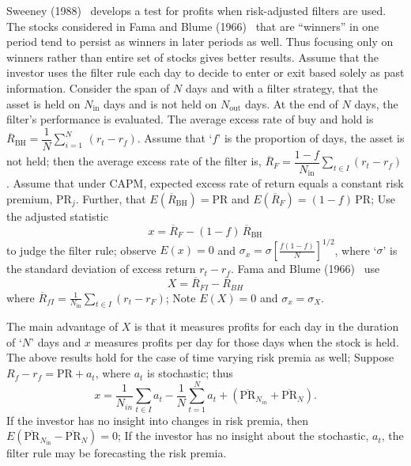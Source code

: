 Sweeney (1988)~\cite{sweet} develops a test for profits when risk-adjusted filters are used. The stocks considered in Fama and Blume (1966)~\cite{famablume} that are ``winners'' in one period tend to persist as winners in later periods as well. Thus focusing only on winners rather than entire set of stocks gives better results. Assume that the investor uses the filter rule each day to decide to enter or exit based solely as past information. Consider the span of $N$ days and with a filter strategy, that the asset is held on $N_{\text{in}}$ days and is not held on $N_{\text{out}}$ days. At the end of $N$ days, the filter's performance is evaluated. The average excess rate of buy and hold is $\overline{R}_{\text{BH}}=\dfrac{1}{N} \sum_{i=1}^N \, (r_t - r_f )$. Assume that `$f$' is the proportion of days, the asset is not held; then the average excess rate of the filter is, $\overline{R}_{F}=\dfrac{1-f}{N_{\text{in}}} \sum_{t \in I} (r_t - r_f)$. Assume that under CAPM, expected excess rate of return equals a constant risk premium, $\text{PR}_{j}$. Further, that $E(\overline{R}_{\text{BH}}) = \text{PR}$ and $E(\overline{R}_{F}) = (1 - f)\,\text{PR}$; Use the adjusted statistic
	\begin{equation} \label{eqn:xbarfirst}
	x= \overline{R}_{F} - (1 - f)\, \overline{R}_{\text{BH}}
	\end{equation}
to judge the filter rule; observe $E(x) = 0$ and $\sigma_{x} = \sigma[\frac{f(1-f)}{N}]^{1/2}$, where `$\sigma$' is the standard deviation of excess return $r_t - r_f$. Fama and Blume (1966)~\cite{famablume} use
	\begin{equation} \label{eqn:bigxbar}
	X = \overline{R}_{FI} - \overline{R}_{BH}
	\end{equation}
where $\overline{R}_{fI} = \frac{1}{N_{\text{in}}} \sum_{t \in I}(r_t - r_F)$; Note $E(X) = 0$ and $\sigma_{x} = \sigma_{X}$.


The main advantage of $X$ is that it measures profits for each day in the duration of `$N$' days and $x$ measures profits per day for those days when the stock is held. The above results hold for the case of time varying risk premia as well; Suppose $R_f - r_f = \text{PR} + a_t$, where $a_t$ is stochastic; thus
	\begin{equation} \label{eqn:anotherxeq}
	x = \dfrac{1}{N_{in}} \sum_{t \in I} a_t - \dfrac{1}{N} \sum_{t=1}^N a_t + (\overline{\text{PR}}_{N_{in} }+\overline{\text{PR}}_N ).
	\end{equation}
If the investor has no insight into changes in risk premia, then $E(\overline{\text{PR}}_{N_{\text{in}}} - \overline{\text{PR}}_{N}) = 0$; If the investor has no insight about the stochastic, $a_t$, the filter rule may be forecasting the risk premia.


